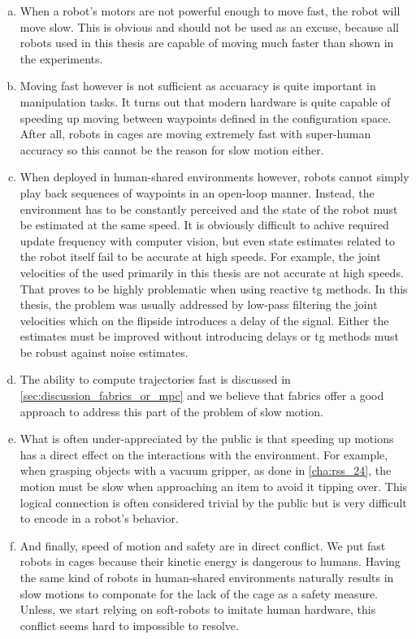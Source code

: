 \begin{enumerate}[(a)]
  \item When a robot's motors are not powerful enough to
    move fast, the robot will move slow. This is obvious and
    should not be used as an excuse, because all robots used
    in this thesis are capable of moving much faster than
    shown in the experiments. 
  \item Moving fast however is not sufficient as accuaracy
    is quite important in manipulation tasks. It turns out
    that modern hardware is quite capable of speeding up
    moving between waypoints defined in the configuration
    space. After all,
    robots in cages are moving extremely fast with
    super-human accuracy so this cannot be the reason for
    slow motion either.
  \item When deployed in human-shared environments however,
    robots cannot simply play back sequences of waypoints in
    an open-loop manner. Instead, the environment has to be
    constantly perceived and the state of the robot must be
    estimated at the same speed. It is obviously difficult
    to achive required update frequency with computer
    vision, but even state estimates related to the robot
    itself fail to be accurate at high speeds. For example,
    the joint velocities of the \panda{} used primarily
    in this thesis are not accurate at high speeds. That
    proves to be highly problematic when using reactive
    \ac{tg} methods. In this thesis, the problem was usually
    addressed by low-pass filtering the joint velocities
    which on the flipside introduces a delay of the signal.
    Either the estimates must be improved without
    introducing delays or \ac{tg} methods must be robust
    against noise estimates.
  \item The ability to compute trajectories fast is
    discussed in \cref{sec:discussion_fabrics_or_mpc} and we
    believe that \ac{fabrics} offer a good approach to
    address this part of the problem of slow motion.
  \item What is often under-appreciated by the public is
    that speeding up motions has a direct effect on the
    interactions with the environment. For example, when
    grasping objects with a vacuum gripper, as done in 
    \cref{cha:rss_24}, the motion must be slow when
    approaching an item to avoid it tipping over. This
    logical connection is often considered trivial by the
    public but is very difficult to encode in a robot's
    behavior.
  \item And finally, speed of motion and safety are in direct
    conflict. We put fast robots in cages because their
    kinetic energy is dangerous to humans. Having the same
    kind of robots in human-shared environments naturally 
    results in slow motions to componate for the lack of
    the cage as a safety measure. Unless, we start relying
    on soft-robots to imitate human hardware, this conflict
    seems hard to impossible to resolve.
\end{enumerate}



